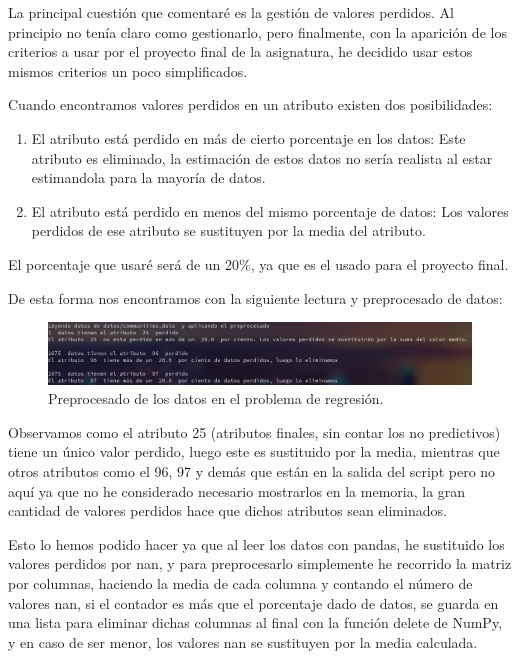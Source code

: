 \documentclass[12pt, spanish]{article}
\begin{document}
La principal cuestión que comentaré es la gestión de valores perdidos. Al principio no tenía claro como gestionarlo, pero finalmente, con la aparición de los criterios a usar por el proyecto final de la asignatura, he decidido usar estos mismos criterios un poco simplificados.

Cuando encontramos valores perdidos en un atributo existen dos posibilidades:

\begin{enumerate}
	\item El atributo está perdido en más de cierto porcentaje en los datos: Este atributo es eliminado, la estimación de estos datos no sería realista al estar estimandola para la mayoría de datos.
	\item El atributo está perdido en menos del mismo porcentaje de datos: Los valores perdidos de ese atributo se sustituyen por la media del atributo.
\end{enumerate}

El porcentaje que usaré será de un 20\%, ya que es el usado para el proyecto final.

De esta forma nos encontramos con la siguiente lectura y preprocesado de datos:

\begin{figure}[H]
	\centering
	\hspace*{-0.5cm}\includegraphics[scale=0.4]{regresion/preprocesado.png}
	\caption{Preprocesado de los datos en el problema de regresión.}
	\label{prepro}
\end{figure}


Observamos como el atributo 25 (atributos finales, sin contar los no predictivos) tiene un único valor perdido, luego este es sustituido por la media, mientras que otros atributos como el 96, 97 y demás que están en la salida del script pero no aquí ya que no he considerado necesario mostrarlos en la memoria, la gran cantidad de valores perdidos hace que dichos atributos sean eliminados.

Esto lo hemos podido hacer ya que al leer los datos con pandas, he sustituido los valores perdidos por nan, y para preprocesarlo simplemente he recorrido la matriz por columnas, haciendo la media de cada columna y contando el número de valores nan\cite{npIsNaN}, si el contador es más que el porcentaje dado de datos, se guarda en una lista para eliminar dichas columnas al final con la función delete de NumPy\cite{npDelete}, y en caso de ser menor, los valores nan se sustituyen por la media calculada.
\end{document}
